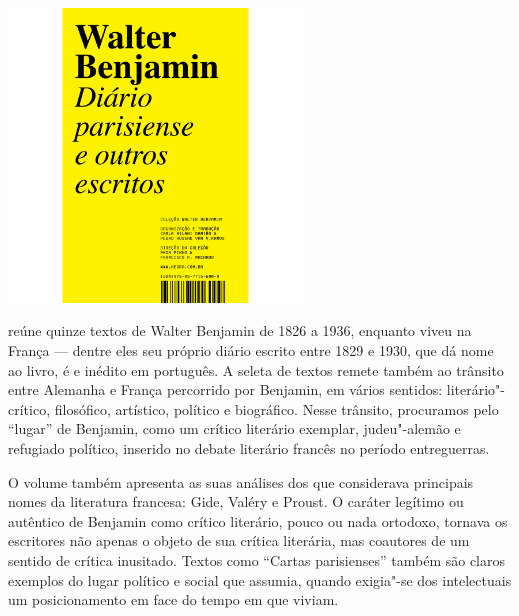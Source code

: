 \pagebreak

\begin{center}
\hspace*{-3.5cm}
\hspace*{3cm}\includegraphics[width=78mm]{./grid/benjamin2.jpg}
\end{center}

\hspace*{-7cm}\hrulefill\hspace*{-7cm}

\medskip

 reúne quinze textos de Walter Benjamin de 1826 a 1936, enquanto viveu na França --- dentre eles seu próprio diário escrito entre 1829 e 1930, que dá nome ao livro, é e inédito em português. A seleta de textos remete também ao trânsito entre Alemanha e França percorrido por Benjamin, em vários sentidos: literário"-crítico, filosófico, artístico, político e biográfico. Nesse trânsito, procuramos pelo “lugar” de Benjamin, como um crítico literário exemplar, judeu"-alemão e refugiado político, inserido no debate literário francês no período entreguerras.

O volume também apresenta as suas análises dos que considerava principais nomes da literatura francesa: Gide, Valéry e Proust. O caráter legítimo ou autêntico de Benjamin como crítico literário, pouco ou nada ortodoxo, tornava os escritores não apenas o objeto de sua crítica literária, mas coautores de um sentido de crítica inusitado. Textos como “Cartas parisienses” também são claros exemplos do lugar político e social que assumia, quando exigia"-se dos intelectuais um posicionamento em face do tempo em que viviam.


